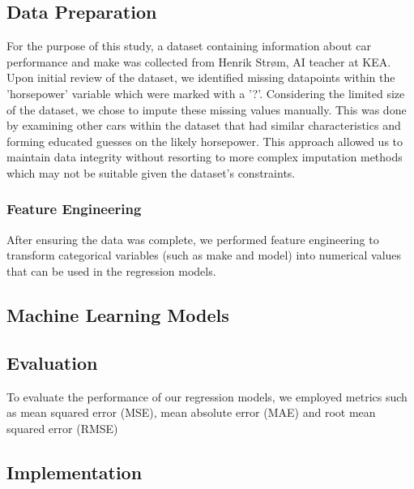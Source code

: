 \documentclass[a4paper, twocolumn]{article}
\begin{document}
\subsection{Data Preparation}

For the purpose of this study, a dataset containing information about car performance and make was collected from Henrik Strøm, AI teacher at KEA. Upon initial review of the dataset, we identified missing datapoints within the 'horsepower' variable which were marked with a '?'. Considering the limited size of the dataset, we chose to impute these missing values manually. This was done by examining other cars within the dataset that had similar characteristics and forming educated guesses on the likely horsepower. This approach allowed us to maintain data integrity without resorting to more complex imputation methods which may not be suitable given the dataset's constraints.

\subsubsection{Feature Engineering}

After ensuring the data was complete, we performed feature engineering to transform categorical variables (such as make and model) into numerical values that can be used in the regression models.

\subsection{Machine Learning Models}

\subsection{Evaluation}
To evaluate the performance of our regression models, we employed metrics such as mean squared error (MSE), mean absolute error (MAE) and root mean squared error (RMSE)

\subsection{Implementation}



\end{document}
